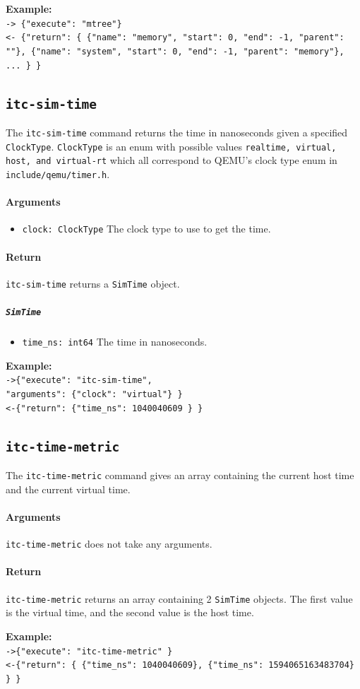 \documentclass{article}
\newcommand{\code}[1]{\texttt{#1}}
\begin{document}
\textbf{Example:}\\
\code{-> \{"execute": "mtree"\}} \\
\code{<- \{"return": \{ \{"name": "memory", "start": 0, "end": -1, "parent": ""\}, \{"name": "system", "start": 0, "end": -1, "parent": "memory"\}, ... \} \}}

\subsection{\code{itc-sim-time}}
The \code{itc-sim-time} command returns the time in nanoseconds given a specified \code{ClockType}. \code{ClockType} is an enum with possible values \code{realtime, virtual, host, and virtual-rt} which all correspond to QEMU's clock type enum in \code{include/qemu/timer.h}.

\paragraph{Arguments}
\begin{itemize}
    \item \code{clock: ClockType}
        \subitem The clock type to use to get the time.
\end{itemize}

\paragraph{Return} \code{itc-sim-time} returns a \code{SimTime} object.
\subparagraph{\code{SimTime}}
\begin{itemize}
    \item \code{time\_ns: int64}
    \subitem The time in nanoseconds.
\end{itemize}

\textbf{Example:}\\
\code{->\{"execute": "itc-sim-time",}\\
\code{"arguments": \{"clock": "virtual"\} \}}\\
\code{<-\{"return": \{"time\_ns": 1040040609 \} \}}

\subsection{\code{itc-time-metric}}
The \code{itc-time-metric} command gives an array containing the current host time and the current virtual time.

\paragraph{Arguments} \code{itc-time-metric} does not take any arguments.

\paragraph{Return} \code{itc-time-metric} returns an array containing 2 \code{SimTime} objects. The first value is the virtual time, and the second value is the host time.

\textbf{Example:}\\
\code{->\{"execute": "itc-time-metric" \}}\\
\code{<-\{"return": \{ \{"time\_ns": 1040040609\}, \{"time\_ns": 1594065163483704\} \} \}}
\end{document}
